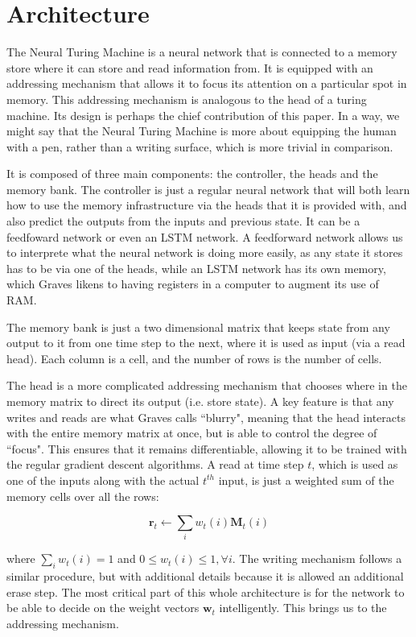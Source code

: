 \documentclass[12pt]{article}
\begin{document}
\section{Architecture}\label{architecture}

The Neural Turing Machine is a neural network that is connected to a
memory store where it can store and read information from.
It is equipped with an addressing mechanism that allows it to focus its
attention on a particular spot in memory. This addressing mechanism
is analogous to the head of a turing machine. Its design is perhaps the
chief contribution of this paper. In a way, we might say that the Neural
Turing Machine is more about equipping the human with a pen,
rather than a writing surface, which is more trivial in comparison.

It is composed of three main components: the controller, the heads and 
the memory bank. The controller is just a regular neural network that will
both learn how to use the memory infrastructure via the heads that
it is provided with, and also predict the outputs
from the inputs and previous state. It can be a feedfoward network or
even an LSTM network. A feedforward network allows us to interprete
what the neural network is doing more easily, as any state it
stores has to be via one of the heads, while an LSTM network has
its own memory, which Graves likens to having registers in a computer to
augment its use of RAM.

The memory bank is just a two dimensional matrix that keeps state from
any output to it from one time step to the next, where it is used
as input (via a read head). Each column is a cell, and the number of
rows is the number of cells.

The head is a more
complicated addressing mechanism that chooses where in the memory matrix
to direct its output (i.e. store state). A key feature is that any writes
and reads are what Graves calls ``blurry", meaning that the head interacts
with the entire memory matrix at once, but is able to control the degree
of ``focus". This ensures that it remains differentiable, allowing it
to be trained with the regular gradient descent algorithms. A read at time
step $t$, which is used as one of the inputs along with the actual $t^{th}$
input, is just a weighted sum of the memory cells over all the rows:

$$
\mathbf{r}_t \leftarrow \sum_i w_t(i) \mathbf{M}_t(i)
$$

where $\sum_i w_t(i) = 1$ and $0 \le w_t(i) \le 1, \forall i$. The writing
mechanism follows a similar procedure, but with additional
details because it is allowed an additional erase step. The most critical part
of this whole architecture is for the network to be able to decide on the weight
vectors $\mathbf{w}_t$ intelligently. This brings us to the addressing mechanism.
\end{document}
